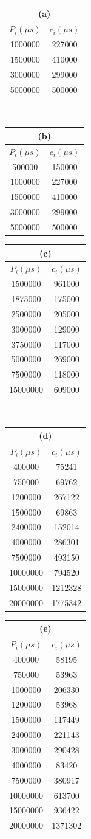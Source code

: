 \documentclass[a4paper,english]{article}
\providecommand{\tabularnewline}{\\}
\begin{document}
\begin{flushleft}
\begin{table}[htbp]
\begin{centering}
\begin{tabular}{|c|c|}
\multicolumn{2}{c}{(a)}\tabularnewline
\hline 
$P_{i}(\mu s)$ & $c_{i}(\mu s)$\tabularnewline
\hline 
1000000 & 227000\tabularnewline
\hline 
1500000 & 410000\tabularnewline
\hline 
3000000 & 299000\tabularnewline
\hline 
5000000 & 500000\tabularnewline
\hline 
\end{tabular}~%
\begin{tabular}{|c|c|}
\multicolumn{2}{c}{(b)}\tabularnewline
\hline
$P_{i}(\mu s)$ & $c_{i}(\mu s)$\tabularnewline
\hline 
500000 & 150000\tabularnewline
\hline 
1000000 & 227000\tabularnewline
\hline 
1500000 & 410000\tabularnewline
\hline 
3000000 & 299000\tabularnewline
\hline 
5000000 & 500000\tabularnewline
\hline
\end{tabular}
\begin{tabular}{|c|c|}
\multicolumn{2}{c}{(c)}\tabularnewline
\hline 
$P_{i}(\mu s)$ & $c_{i}(\mu s)$\tabularnewline
\hline 
1500000 & 961000\tabularnewline
\hline 
1875000 & 175000\tabularnewline
\hline 
2500000 & 205000\tabularnewline
\hline 
3000000 & 129000\tabularnewline
\hline 
3750000 & 117000\tabularnewline
\hline 
5000000 & 269000\tabularnewline
\hline 
7500000 & 118000\tabularnewline
\hline 
15000000 & 609000\tabularnewline
\hline 
\end{tabular}~%
\begin{tabular}{|c|c|}
\multicolumn{2}{c}{(d)}\tabularnewline
\hline
$P_{i}(\mu s)$ & $c_{i}(\mu s)$\tabularnewline
\hline 
400000 & 75241\tabularnewline
\hline 
750000 & 69762\tabularnewline
\hline 
1200000 & 267122\tabularnewline
\hline 
1500000 & 69863\tabularnewline
\hline 
2400000 & 152014\tabularnewline
\hline 
4000000 & 286301\tabularnewline
\hline 
7500000 & 493150\tabularnewline
\hline 
10000000 & 794520\tabularnewline
\hline 
15000000 & 1212328\tabularnewline
\hline 
20000000 & 1775342\tabularnewline
\hline
\end{tabular}
\begin{tabular}{|c|c|}
\multicolumn{2}{c}{(e)}\tabularnewline
\hline
$P_{i}(\mu s)$ & $c_{i}(\mu s)$\tabularnewline
\hline
400000 & 58195\tabularnewline
\hline 
750000 & 53963\tabularnewline
\hline 
1000000 & 206330\tabularnewline
\hline 
1200000 & 53968\tabularnewline
\hline 
1500000 & 117449\tabularnewline
\hline 
2400000 & 221143\tabularnewline
\hline 
3000000 & 290428\tabularnewline
\hline 
4000000 & 83420\tabularnewline
\hline 
7500000 & 380917\tabularnewline
\hline 
10000000 & 613700\tabularnewline
\hline 
15000000 & 936422\tabularnewline
\hline 
20000000 & 1371302\tabularnewline
\hline
\end{tabular}  

\end{centering}
\end{table}
\end{flushleft}
\end{document}
